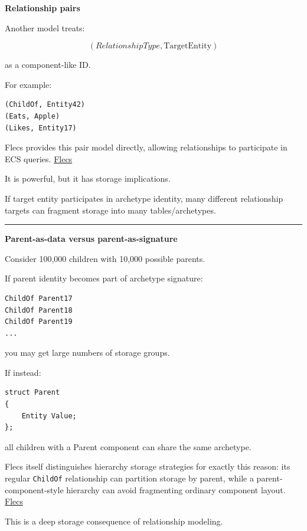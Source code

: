\textbf{Relationship pairs}

Another model treats:

\[
(RelationshipType,\text{TargetEntity})
\]

as a component-like ID.

For example:

\begin{verbatim}
(ChildOf, Entity42)
(Eats, Apple)
(Likes, Entity17)
\end{verbatim}

Flecs provides this pair model directly, allowing relationships to participate in ECS queries. \href{https://www.flecs.dev/flecs/Relationships.html?utm_source=chatgpt.com}{Flecs}

It is powerful, but it has storage implications.

If target entity participates in archetype identity, many different relationship targets can fragment storage into many tables/archetypes.

\begin{center}\rule{0.5\linewidth}{0.5pt}\end{center}

\textbf{Parent-as-data versus parent-as-signature}

Consider 100,000 children with 10,000 possible parents.

If parent identity becomes part of archetype signature:

\begin{verbatim}
ChildOf Parent17
ChildOf Parent18
ChildOf Parent19
...
\end{verbatim}

you may get large numbers of storage groups.

If instead:

\begin{verbatim}
struct Parent
{
    Entity Value;
};
\end{verbatim}

all children with a Parent component can share the same archetype.

Flecs itself distinguishes hierarchy storage strategies for exactly this reason: its regular \texttt{ChildOf} relationship can partition storage by parent, while a parent-component-style hierarchy can avoid fragmenting ordinary component layout. \href{https://www.flecs.dev/flecs/HierarchiesManual.html?utm_source=chatgpt.com}{Flecs}

This is a deep storage consequence of relationship modeling.


